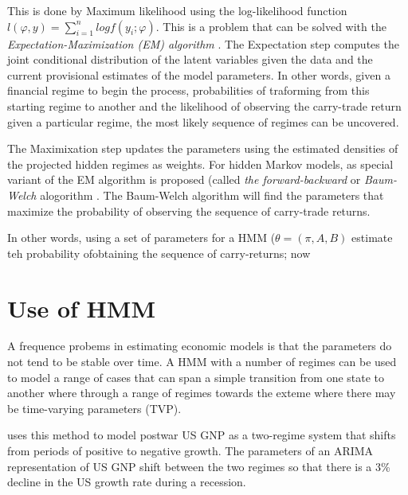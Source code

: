 \documentclass[12pt, a4paper, oneside]{article} %
\begin{document}
This is done by Maximum likelihood using the log-likelihood function $l(\varphi, y) = \sum_{i=1}^n log f(y_i; \varphi)$. This is a problem that can be solved with the \emph{Expectation-Maximization (EM) algorithm} \citet{dempster1977maximum}. The Expectation step computes the joint conditional distribution of the latent variables given the data and the current provisional estimates of the model parameters. In other words, given a financial regime to begin the process, probabilities of traforming from this starting regime to another and the likelihood of observing the carry-trade return given a particular regime, the most likely sequence of regimes can be uncovered. 

The Maximixation step updates the parameters using the estimated densities of the projected hidden regimes as weights. For hidden Markov models, as special variant of the EM algorithm is proposed (called \emph{the forward-backward} or \emph{Baum-Welch} alogorithm \citet{Baum1970}.   The Baum-Welch algorithm will find the parameters that maximize the probability of observing the sequence of carry-trade returns.  

In other words, using a set of parameters for a HMM ($\theta = (\pi, A, B)$ estimate teh probability ofobtaining the sequence of carry-returns; now 


\section{Use of HMM}
A frequence probems in estimating economic models is that the parameters do not tend to be stable over time.  A HMM with a number of regimes can be used to model a range of cases that can span a simple transition from one state to another where through a range of regimes towards the exteme where there may be time-varying parameters (TVP).  

\citet{Hamilton1989} uses this method to model postwar US GNP as a two-regime system that shifts from periods of positive to negative growth. The parameters of an ARIMA representation of US GNP shift between the two regimes so that there is a 3\% decline in the US growth rate during a recession.  


\end{document}
